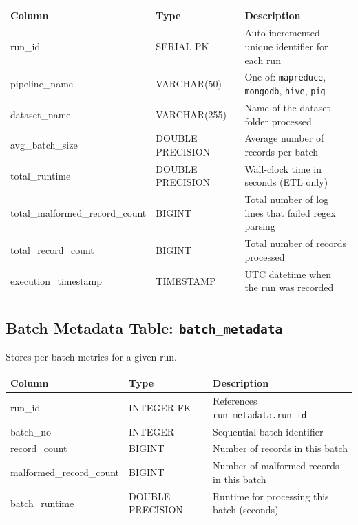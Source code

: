 \documentclass[11pt,a4paper]{article}
\begin{document}
\begin{schematable}
\begin{tabularx}{\linewidth}{@{} >{\ttfamily\small}l >{\small}l X @{}}
\toprule
\textnormal{\textbf{Column}} & \textbf{Type} & \textbf{Description} \\
\midrule
run\_id                       & SERIAL PK    & Auto-incremented unique identifier for each run \\
pipeline\_name                & VARCHAR(50)  & One of: \texttt{mapreduce}, \texttt{mongodb}, \texttt{hive}, \texttt{pig} \\
dataset\_name                 & VARCHAR(255) & Name of the dataset folder processed \\
avg\_batch\_size              & DOUBLE PRECISION & Average number of records per batch \\
total\_runtime                & DOUBLE PRECISION & Wall-clock time in seconds (ETL only) \\
total\_malformed\_record\_count & BIGINT     & Total number of log lines that failed regex parsing \\
total\_record\_count          & BIGINT       & Total number of records processed \\
execution\_timestamp          & TIMESTAMP    & UTC datetime when the run was recorded \\
\bottomrule
\end{tabularx}
\end{schematable}

\subsection{Batch Metadata Table: \texttt{batch\_metadata}}

Stores per-batch metrics for a given run.

\begin{schematable}
\begin{tabularx}{\linewidth}{@{} >{\ttfamily\small}l >{\small}l X @{}}
\toprule
\textnormal{\textbf{Column}} & \textbf{Type} & \textbf{Description} \\
\midrule
run\_id                 & INTEGER FK & References \texttt{run\_metadata.run\_id} \\
batch\_no               & INTEGER    & Sequential batch identifier \\
record\_count           & BIGINT     & Number of records in this batch \\
malformed\_record\_count & BIGINT     & Number of malformed records in this batch \\
batch\_runtime          & DOUBLE PRECISION & Runtime for processing this batch (seconds) \\
\bottomrule
\end{tabularx}
\end{schematable}
\end{document}
